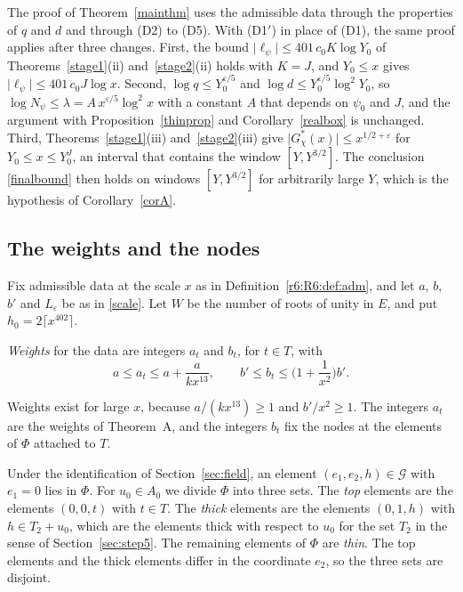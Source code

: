 The proof of Theorem~\ref{mainthm} uses the admissible data through the properties of $q$ and $d$ and through (D2) to (D5). With (D1$'$) in place of (D1), the same proof applies after three changes. First, the bound $\lvert\ell_\psi\rvert\le401\,c_0K\log Y_0$ of Theorems~\ref{stage1}(ii) and~\ref{stage2}(ii) holds with $K=J$, and $Y_0\le x$ gives $\lvert\ell_\psi\rvert\le401\,c_0J\log x$. Second, $\log q\le Y_0^{\varepsilon/5}$ and $\log d\le Y_0^{\varepsilon/5}\log^2Y_0$, so $\log N_\psi\le\lambda=A\,x^{\varepsilon/5}\log^2x$ with a constant $A$ that depends on $\psi_0$ and $J$, and the argument with Proposition~\ref{thinprop} and Corollary~\ref{realbox} is unchanged. Third, Theorems~\ref{stage1}(iii) and~\ref{stage2}(iii) give $\lvert G^\ast_\chi(x)\rvert\le x^{1/2+\varepsilon}$ for $Y_0\le x\le Y_0^J$, an interval that contains the window $[Y,Y^{3/2}]$. The conclusion \eqref{finalbound} then holds on windows $[Y,Y^{3/2}]$ for arbitrarily large $Y$, which is the hypothesis of Corollary~\ref{corA}.

\subsection{The weights and the nodes}\label{r6:R6:sec:nodes}

Fix admissible data at the scale $x$ as in Definition~\ref{r6:R6:def:adm}, and let $a$, $b$, $b'$ and $L_\varepsilon$ be as in \eqref{scale}. Let $W$ be the number of roots of unity in $E$, and put $h_0=2\lceil x^{402}\rceil$.

\begin{definition}\label{r6:R6:def:weights}
\emph{Weights} for the data are integers $a_t$ and $b_t$, for $t\in T$, with
\[
a\le a_t\le a+\frac a{kx^{13}},\qquad b'\le b_t\le\Big(1+\frac1{x^2}\Big)b' .
\]
\end{definition}

Weights exist for large $x$, because $a/(kx^{13})\ge1$ and $b'/x^2\ge1$. The integers $a_t$ are the weights of Theorem~A, and the integers $b_t$ fix the nodes at the elements of $\Phi$ attached to $T$.

Under the identification of Section~\ref{sec:field}, an element $(e_1,e_2,h)\in\mathcal G$ with $e_1=0$ lies in $\Phi$. For $u_0\in A_0$ we divide $\Phi$ into three sets. The \emph{top} elements are the elements $(0,0,t)$ with $t\in T$. The \emph{thick} elements are the elements $(0,1,h)$ with $h\in T_2+u_0$, which are the elements thick with respect to $u_0$ for the set $T_2$ in the sense of Section~\ref{sec:step5}. The remaining elements of $\Phi$ are \emph{thin}. The top elements and the thick elements differ in the coordinate $e_2$, so the three sets are disjoint.

